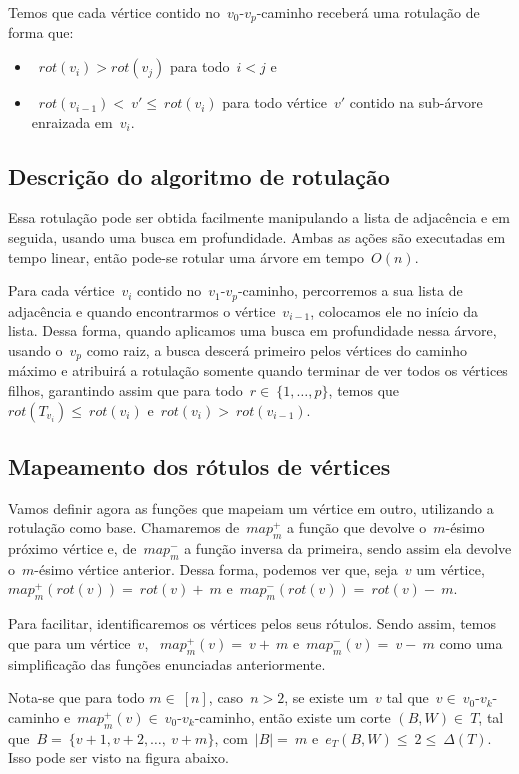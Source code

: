 \documentclass[a4paper,12pt]{article}
\begin{document}
	Temos que cada vértice contido no~$v_0$-$v_p$-caminho receberá uma 
	rotulação de forma que:
	\begin{itemize}
		\item~$rot(v_i)>rot(v_j)$ para todo~$i<j$ e
		\item~$rot(v_{i-1})<~v' \le~rot(v_i)$ para todo vértice~$v'$ contido 
		na sub-árvore enraizada em~$v_i$. 
	\end{itemize}

	\bigskip
	\bigskip

	\subsection{Descrição do algoritmo de rotulação}
	Essa rotulação pode ser obtida facilmente 
	manipulando a lista de adjacência e em seguida,
	usando uma busca em profundidade.
	Ambas as ações são executadas em tempo linear, então
	pode-se rotular uma árvore em tempo~$O(n)$.

	Para cada vértice~$v_i$ contido no~$v_1$-$v_{p}$-caminho, percorremos
	a sua lista de adjacência e quando encontrarmos o 
	vértice~$v_{i-1}$, colocamos ele no início da lista.
	Dessa forma, quando aplicamos uma busca em profundidade
	nessa árvore, usando o~$v_p$ como raiz, a busca descerá primeiro
	pelos vértices do caminho máximo e atribuirá a rotulação
	somente quando terminar de ver todos os vértices filhos, garantindo
	assim que para todo~$r\in~\{1,\ldots, p\}$, temos 
	que~$rot(T_{v_i})\le~rot(v_i)$ e~$rot(v_i)>~rot(v_{i-1})$.
	
	\bigskip
	\bigskip

	\subsection{Mapeamento dos rótulos de vértices }
	Vamos definir agora as funções que mapeiam um vértice em 
	outro, utilizando a rotulação como base.
	Chamaremos de~$map^+_m$
	a função que devolve o~$m$-ésimo próximo vértice e,
	de~$map^-_m$ a função inversa da primeira, sendo assim
	ela devolve o~$m$-ésimo vértice anterior.
	Dessa forma, podemos ver que, seja~$v$ um 
	vértice, ~$map^+_m(rot(v)) =~rot(v)+~m$ 
	e~$map^-_m(rot(v)) =~rot(v)-~m$.

	Para facilitar, identificaremos os vértices pelos
	seus rótulos. Sendo assim, temos 
	que para um vértice~$v$, ~$map^+_m(v) =~v+~m$ 
	e~$map^-_m(v) =~v-~m$ como uma simplificação das funções
	enunciadas anteriormente.

	Nota-se que para todo $m\in~[n]$, caso~$n>2$, se existe 
	um~$v$ tal 
	que~$v\in~v_0$-$v_k$-caminho 
	e~$map^+_m(v)\in~v_0$-$v_k$-caminho, então 
	existe um corte $(B,W)\in~T$, tal 
	que~$B =~\{v+1, v+2,\ldots,~v+m\}$, com~$|B|=~m$
	e~$e_T(B,W)\le~2\le~\Delta(T)$.
	Isso pode ser visto na figura abaixo.
\end{document}
